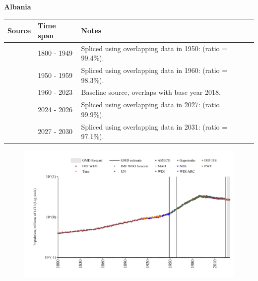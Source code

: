\documentclass[12pt,a4paper,landscape]{article}
\begin{document}
\begin{adjustbox}{max totalsize={\paperwidth}{\paperheight},center}
\begin{minipage}[t][\textheight][t]{\textwidth}
\vspace*{0.5cm}
{}
\begin{center}
{\Large\bfseries Albania}
\end{center}
\vspace{0.5cm}
\begin{table}[H]
\centering
\small
\begin{tabular}{|l|l|l|}
\hline
\textbf{Source} & \textbf{Time span} & \textbf{Notes} \\
\hline
\rowcolor{white}\cite{Gapminder}& 1800 - 1949 &Spliced using overlapping data in 1950: (ratio = 99.4\%).\\
\rowcolor{lightgray}\cite{IMF_IFS}& 1950 - 1959 &Spliced using overlapping data in 1960: (ratio = 98.3\%).\\
\rowcolor{white}\cite{WDI}& 1960 - 2023 &Baseline source, overlaps with base year 2018.\\
\rowcolor{lightgray}\cite{AMECO}& 2024 - 2026 &Spliced using overlapping data in 2027: (ratio = 99.9\%).\\
\rowcolor{white}\cite{Gapminder}& 2027 - 2030 &Spliced using overlapping data in 2031: (ratio = 97.1\%).\\
\hline
\end{tabular}
\end{table}
\begin{figure}[H]
\centering
\includegraphics[width=\textwidth,height=0.6\textheight,keepaspectratio]{graphs/ALB_pop.pdf}
\end{figure}
\end{minipage}
\end{adjustbox}
\end{document}
